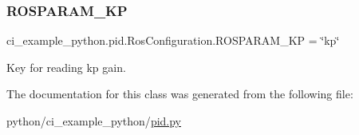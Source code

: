\subsubsection{\texorpdfstring{R\+O\+S\+P\+A\+R\+A\+M\+\_\+\+KP}{ROSPARAM\_KP}}
{\footnotesize\ttfamily ci\+\_\+example\+\_\+python.\+pid.\+Ros\+Configuration.\+R\+O\+S\+P\+A\+R\+A\+M\+\_\+\+KP = \char`\"{}kp\char`\"{}\hspace{0.3cm}{\ttfamily [static]}}



Key for reading kp gain. 



The documentation for this class was generated from the following file\+:\begin{DoxyCompactItemize}
\item 
python/ci\+\_\+example\+\_\+python/\hyperlink{pid_8py}{pid.\+py}\end{DoxyCompactItemize}
